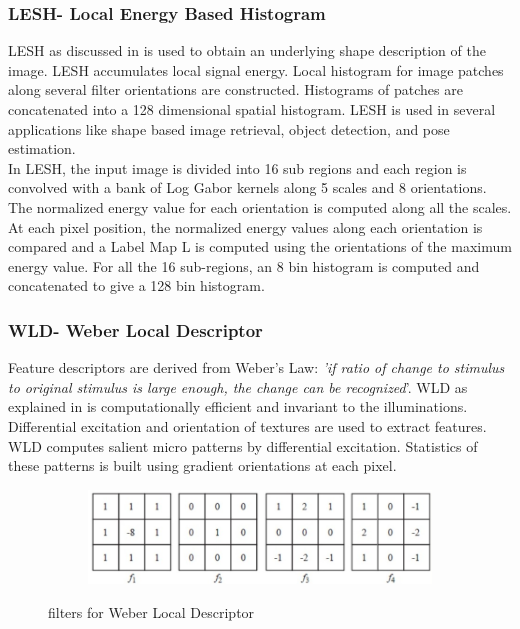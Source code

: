 \documentclass[english, 12pt]{article}
\begin{document}
\subsubsection{LESH- Local Energy Based Histogram}
\tab LESH as discussed in \cite{Wajid:2015:LES:2793715.2793763} is used to obtain an underlying shape description of the image. LESH accumulates local signal energy. Local histogram for image patches along several filter orientations are constructed. Histograms of patches are concatenated into a 128 dimensional spatial histogram. LESH is used in several applications like shape based image retrieval, object detection, and pose estimation.
\\
\tab In LESH, 	the input image is divided into 16 sub regions and each region is convolved with a bank of Log Gabor kernels along 5 scales and 8 orientations. The normalized energy value for each orientation is computed along all the scales. At 	each pixel position, the normalized energy values along each orientation is compared and a Label Map L is computed using the orientations of the maximum energy value. For all the 16 sub-regions, an 8 bin histogram is computed and concatenated to give a 128 	  bin histogram.

\subsubsection{WLD- Weber Local Descriptor}
\tab Feature descriptors are derived from Weber’s Law:
\textit{'if ratio of change to stimulus to original stimulus is large enough, the change can be recognized}'. WLD as explained in \cite{6166675} is computationally efficient and invariant to the illuminations. Differential excitation and orientation of textures are used to extract features. WLD computes salient micro patterns by differential excitation. Statistics of these patterns is built using gradient orientations at each pixel.

\begin{figure}[H]
    \centering
    \begin{subfigure}[b]{0.55\textwidth}
        \includegraphics[width=\textwidth]{wld.jpg}
    \end{subfigure}
    \centering
    \caption{filters for Weber Local Descriptor}\label{fig:wld}
\end{figure}
\end{document}
